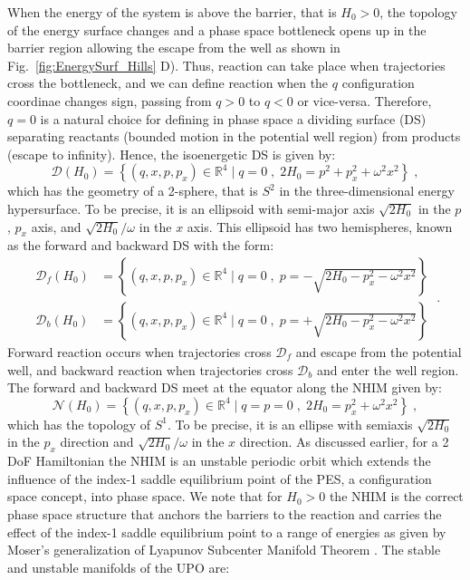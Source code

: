 \documentclass[8pt]{article}
\begin{document}
When the energy of the system is above the barrier, that is $H_0 > 0$, the topology of the energy surface changes and a phase space bottleneck opens up in the barrier region allowing the escape from the well as shown in Fig.~\ref{fig:EnergySurf_Hills} D). Thus, reaction can take place when trajectories cross the bottleneck, and we can define reaction when the $q$ configuration coordinae changes sign, passing from $q > 0$ to $q < 0$ or vice-versa.	Therefore, $q=0$ is a natural choice for defining in phase space a dividing surface (DS) separating reactants (bounded motion in the potential well region) from products (escape to infinity). Hence, the isoenergetic DS is given by:
\begin{equation}
\mathcal{D}(H_0) = \left\{ (q,x,p,p_x) \in \mathbb{R}^4 \; | \; q = 0 \;,\; 2H_0 = p^2 + p_x^2 + \omega^2 x^2 \right\} \;,
\end{equation}
which has the geometry of a 2-sphere, that is $S^2$ in the three-dimensional energy hypersurface. To be precise, it is an ellipsoid with semi-major axis $\sqrt{2H_0}$ in the $p$, $p_x$ axis, and $\sqrt{2H_0}/\omega$ in the $x$ axis. This ellipsoid has two hemispheres, known as the forward and backward DS with the form:
\begin{equation}
\begin{split}
\mathcal{D}_f(H_0) &= \left\{ (q,x,p,p_x) \in \mathbb{R}^4 \; | \; q = 0 \;,\; p =- \sqrt{2H_0 -  p_x^2 - \omega^2 x^2} \right\} \\[.1cm]
\mathcal{D}_b(H_0) &= \left\{ (q,x,p,p_x) \in \mathbb{R}^4 \; | \; q = 0 \;,\; p = +\sqrt{2H_0 -  p_x^2 - \omega^2 x^2} \right\} 
\end{split}
\;.
\end{equation}
Forward reaction occurs when trajectories cross $\mathcal{D}_f$ and escape from the potential well, and backward reaction when trajectories cross $\mathcal{D}_b$ and enter the well region. The forward and backward DS meet at the equator along the NHIM given by:
\begin{equation}
\mathcal{N}(H_0) = \left\{ (q,x,p,p_x) \in \mathbb{R}^4 \; | \; q = p = 0 \;,\; 2H_0 = p_x^2 + \omega^2 x^2 \right\} \;,
\end{equation}
which has the topology of $S^1$. To be precise, it is an ellipse with semiaxis $\sqrt{2H_0}$ in the $p_x$ direction and $\sqrt{2H_0}/\omega$ in the $x$ direction. As discussed earlier, for a 2 DoF Hamiltonian the NHIM is an unstable periodic orbit which extends the influence of the index-1 saddle equilibrium point of the PES, a configuration space concept, into phase space. We note that for $H_0 > 0$ the NHIM is the correct phase space structure that anchors the barriers to the reaction and carries the effect of the index-1 saddle equilibrium point to a range of energies as given by Moser's generalization of Lyapunov Subcenter Manifold Theorem \cite{wiggins2003applied}. The stable and unstable manifolds of the UPO are: 
\end{document}
